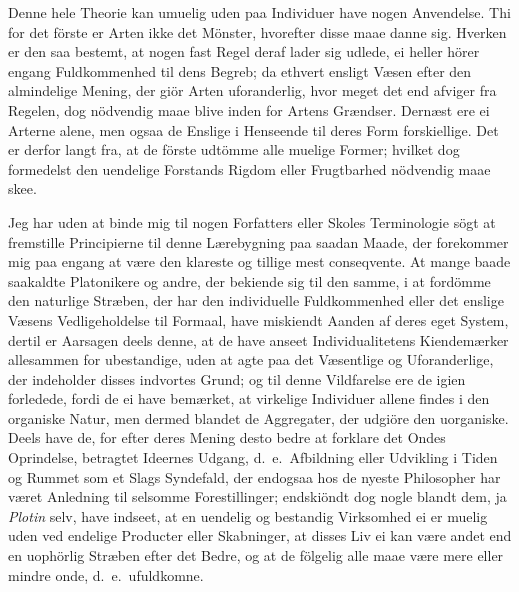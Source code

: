 \documentclass[12pt,a4paper]{article}
\newcommand{\opage}[1]{\marginnote{\footnotesize\textit{[#1]}}}
\begin{document}
Denne hele Theorie kan umuelig uden paa Individuer have nogen Anvendelse.
Thi for det förste er Arten ikke det Mönster, hvorefter disse maae danne
sig. Hverken er den saa bestemt, at nogen fast Regel deraf lader sig udlede,
ei heller hörer engang Fuldkommenhed til dens Begreb; da ethvert ensligt
Væsen efter den almindelige Mening, der giör Arten uforanderlig, hvor meget
det end afviger fra Regelen, dog nödvendig maae blive inden for Artens
Grændser. Dernæst ere ei Arterne alene, men ogsaa de Enslige i Henseende
til deres Form forskiellige. Det er derfor langt fra, at de förste udtömme
alle muelige Former; hvilket dog formedelst den uendelige Forstands Rigdom
eller Frugtbarhed nödvendig maae skee.

Jeg har uden at binde mig til nogen Forfatters eller Skoles Terminologie
sögt at fremstille Principierne til denne Lærebygning
\opage{245} paa saadan Maade, der forekommer mig paa engang at være den klareste og
tillige mest conseqvente. At mange baade saakaldte Platonikere og andre,
der bekiende sig til den samme, i at fordömme den naturlige Stræben, der
har den individuelle Fuldkommenhed eller det enslige Væsens Vedligeholdelse
til Formaal, have miskiendt Aanden af deres eget System, dertil er Aarsagen
deels denne, at de have anseet Individualitetens Kiendemærker allesammen for
ubestandige, uden at agte paa det Væsentlige og Uforanderlige, der
indeholder disses indvortes Grund; og til denne Vildfarelse ere de igien
forledede, fordi de ei have bemærket, at virkelige Individuer allene findes
i den organiske Natur, men dermed blandet de Aggregater, der udgiöre den
uorganiske. Deels have de, for efter deres Mening desto bedre at forklare
det Ondes Oprindelse, betragtet Ideernes Udgang, d.~e.\ Afbildning eller
Udvikling i Tiden og Rummet som et Slags Syndefald, der endogsaa hos de
nyeste Philosopher har været Anledning til selsomme Forestillinger;
endskiöndt dog nogle blandt dem, ja \emph{Plotin} selv, have indseet, at en
uendelig og bestandig Virksomhed ei er muelig uden ved endelige Producter
eller Skabninger, at disses Liv ei kan være andet end en uophörlig Stræben
efter det Bedre, og at de fölgelig alle maae være mere eller mindre onde,
d.~e.\ ufuldkomne.
\end{document}
